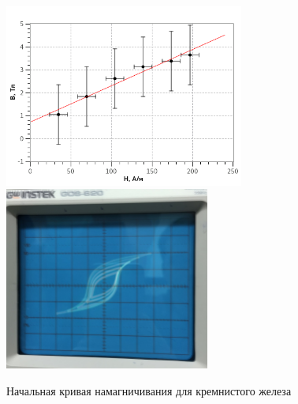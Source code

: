 \documentclass{article}
\begin{document}
   \begin{figure}[h]
   \centering
   \includegraphics[height=6cm]{plot3.png} 
   \includegraphics[height=6cm]{fig4.jpg}  
   \caption{Начальная кривая намагничивания для кремнистого железа} 
   \label{fig.4} 
   \end{figure}
\end{document}
